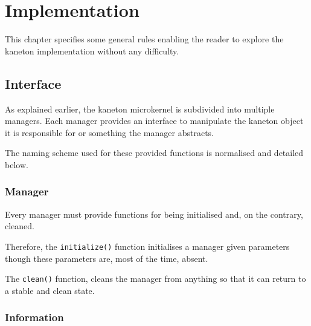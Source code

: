 %
%
%
%
%
%

%
%

\chapter{Implementation}
\label{chapter:implementation}

This chapter specifies some general rules enabling the reader to explore
the kaneton implementation without any difficulty.

\newpage

%
%

%
%

\section{Interface}

As explained earlier, the kaneton microkernel is subdivided into multiple
managers. Each manager provides an interface to manipulate the kaneton object
it is responsible for or something the manager abstracts.

The naming scheme used for these provided functions is normalised and
detailed below.


\subsection*{Manager}

Every manager must provide functions for being initialised and, on the
contrary, cleaned.

Therefore, the \texttt{initialize()} function initialises a manager given
parameters though these parameters are, most of the time, absent.

The \texttt{clean()} function, cleans the manager from anything so that it
can return to a stable and clean state.


\subsection*{Information}

